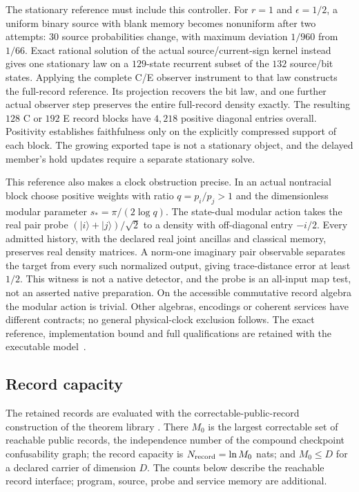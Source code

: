 \documentclass[11pt]{article}
\theoremstyle{definition}
\theoremstyle{remark}
\theoremstyle{plain}
\begin{document}
The stationary reference must include this controller. For $r=1$ and
$\epsilon=1/2$, a uniform binary source with blank memory becomes nonuniform
after two attempts: $30$ source probabilities change, with maximum deviation
$1/960$ from $1/66$. Exact rational solution of the actual source/current-sign
kernel instead gives one stationary law on a $129$-state recurrent subset of
the $132$ source/bit states. Applying the complete C/E observer instrument to
that law constructs the full-record reference. Its projection recovers the
bit law, and one further actual observer step preserves the entire full-record
density exactly. The resulting $128$ C or $192$ E record blocks have $4{,}218$
positive diagonal entries overall. Positivity establishes faithfulness only
on the explicitly compressed support of each block. The growing exported
tape is not a stationary object, and the delayed member's hold updates require
a separate stationary solve.

This reference also makes a clock obstruction precise. In an actual
nontracial block choose positive weights with ratio $q=p_i/p_j>1$ and the
dimensionless modular parameter $s_* = \pi/(2\log q)$. The state-dual modular
action takes the real pair probe $(|i\rangle+|j\rangle)/\sqrt2$ to a density
with off-diagonal entry $-i/2$. Every admitted history, with the declared real
joint ancillas and classical memory, preserves real density matrices.
A norm-one imaginary pair observable separates the target from every such
normalized output, giving trace-distance error at least $1/2$. This witness
is not a native detector, and the probe is an all-input map test, not an
asserted native preparation. On the accessible commutative record algebra
the modular action is trivial. Other algebras, encodings or coherent services
have different contracts; no general physical-clock exclusion follows.
The exact reference, implementation bound and full qualifications are
retained with the executable model~\cite{ophrepo}.

\subsection{Record capacity}
\label{sec:capacity}

The retained records are evaluated with the correctable-public-record
construction of the theorem library \cite{ophobservers,oCAP}. There $M_0$ is
the largest correctable set of reachable public records, the independence
number of the compound checkpoint confusability graph; the record capacity is
$N_{\rm record}=\ln M_0$ nats; and $M_0\le D$ for a declared carrier of
dimension $D$. The counts below describe the reachable record interface;
program, source, probe and service memory are additional.
\end{document}
